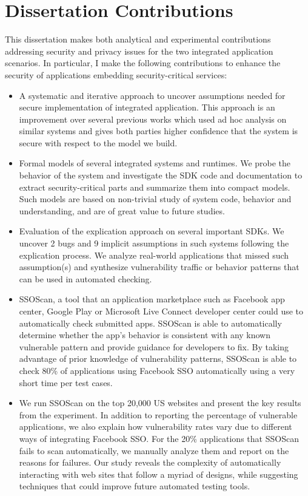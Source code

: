 \section{Dissertation Contributions}  

This dissertation makes both analytical and experimental contributions addressing security and privacy issues for the two integrated application scenarios.  In particular, I make the following contributions to enhance the security of applications embedding security-critical services:

\begin{itemize}

\item A systematic and iterative approach to uncover assumptions needed for secure implementation of integrated application.  This approach is an improvement over several previous works which used ad hoc analysis on similar systems and gives both parties higher confidence that the system is secure with respect to the model we build.  

\item Formal models of several integrated systems and runtimes.  We probe the behavior of the system and investigate the SDK code and documentation to extract security-critical parts and summarize them into compact models.  Such models are based on non-trivial study of system code, behavior and understanding, and are of great value to future studies.

\item Evaluation of the explication approach on several important SDKs.  We uncover 2 bugs and 9 implicit assumptions in such systems following the explication process.  We analyze real-world applications that missed such assumption(s) and synthesize vulnerability traffic or behavior patterns that can be used in automated checking.

\item SSOScan, a tool that an application marketplace such as Facebook app center, Google Play or Microsoft Live Connect developer center could use to automatically check submitted apps.  SSOScan is able to automatically determine whether the app's behavior is consistent with any known vulnerable pattern and provide guidance for developers to fix.  By taking advantage of prior knowledge of vulnerability patterns, SSOScan is able to check 80\% of applications using Facebook SSO automatically using a very short time per test cases.

\item We run SSOScan on the top 20,000 US websites and present the key results from the experiment.  In addition to reporting the percentage of vulnerable applications, we also explain how vulnerability rates vary due to different ways of integrating Facebook SSO.  For the 20\% applications that SSOScan fails to scan automatically, we manually analyze them and report on the reasons for failures.  Our study reveals the complexity of automatically interacting with web sites that follow a myriad of designs, while suggesting techniques that could improve future automated testing tools. 

\end{itemize}

